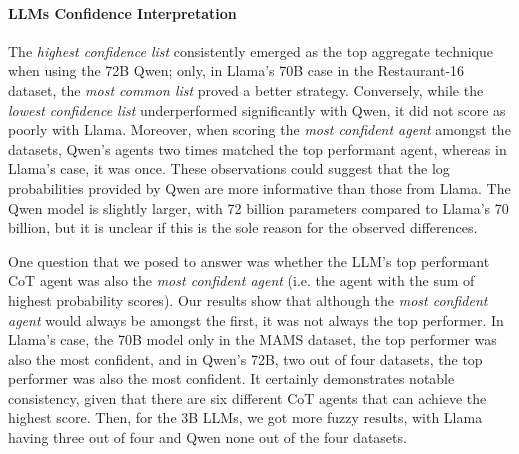 \documentclass[11pt]{article}
\begin{document}








\paragraph{LLMs Confidence Interpretation}
\label{par:conf}
The \textit{highest confidence list} consistently emerged as the top aggregate technique when using the 72B Qwen; only, in Llama's 70B case in the Restaurant-16 dataset, the \textit{most common list} proved a better strategy. Conversely, while the \textit{lowest confidence list} underperformed significantly with Qwen, it did not score as poorly with Llama. Moreover, when scoring the \textit{most confident agent} amongst the datasets, Qwen's agents two times matched the top performant agent, whereas in Llama's case, it was once. These observations could suggest that the log probabilities provided by Qwen are more informative than those from Llama. The Qwen model is slightly larger, with 72 billion parameters compared to Llama's 70 billion, but it is unclear if this is the sole reason for the observed differences.

One question that we posed to answer was whether the LLM's top performant CoT agent was also the \textit{most confident agent} (i.e. the agent with the sum of highest probability scores). Our results show that although the \textit{most confident agent} would always be amongst the first, it was not always the top performer. In Llama's case, the 70B model only in the MAMS dataset, the top performer was also the most confident, and in Qwen's 72B, two out of four datasets, the top performer was also the most confident. It certainly demonstrates notable consistency, given that there are six different CoT agents that can achieve the highest score. Then, for the 3B LLMs, we got more fuzzy results, with Llama having three out of four and Qwen none out of the four datasets.
\end{document}
